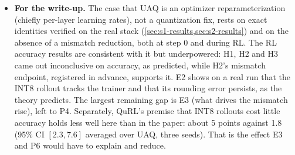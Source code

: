 \documentclass[11pt]{article}
\begin{document}
\begin{itemize}
\item \textbf{For the write-up.} The case that UAQ is an optimizer reparameterization (chiefly per-layer learning rates), not a quantization fix, rests on exact identities verified on the real stack (\cref{sec:s1-results,sec:s2-results}) and on the absence of a mismatch reduction, both at step 0 and during RL. The RL accuracy results are consistent with it but underpowered: H1, H2 and H3 came out inconclusive on accuracy, as predicted, while H2's mismatch endpoint, registered in advance, supports it. E2 shows on a real run that the INT8 rollout tracks the trainer and that its rounding error persists, as the theory predicts. The largest remaining gap is E3 (what drives the mismatch rise), left to P4. Separately, QuRL's premise that INT8 rollouts cost little accuracy holds less well here than in the paper: about 5 points against 1.8 (95\% CI $[2.3, 7.6]$ averaged over UAQ, three seeds). That is the effect E3 and P6 would have to explain and reduce.
\end{itemize}

\end{document}
